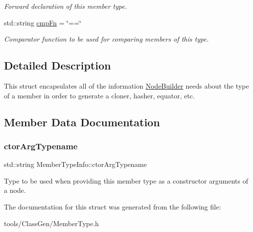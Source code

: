 \begin{DoxyCompactItemize}
\begin{DoxyCompactList}\small\item\em Forward declaration of this member type. \end{DoxyCompactList}\item 
\mbox{\label{struct_member_type_info_abf6a66ee80b0f3680c6bd0b86d61a858}} 
std\+::string \hyperlink{struct_member_type_info_abf6a66ee80b0f3680c6bd0b86d61a858}{cmp\+Fn} = \char`\"{}==\char`\"{}
\begin{DoxyCompactList}\small\item\em Comparator function to be used for comparing members of this type. \end{DoxyCompactList}\end{DoxyCompactItemize}


\subsection{Detailed Description}
This struct encapsulates all of the information \hyperlink{class_node_builder}{Node\+Builder} needs about the type of a member in order to generate a cloner, hasher, equator, etc. 

\subsection{Member Data Documentation}
\mbox{\label{struct_member_type_info_a9ffc1a49b5f4f42c42175ad77444176b}} 
\subsubsection{\texorpdfstring{ctor\+Arg\+Typename}{ctorArgTypename}}
{\footnotesize\ttfamily std\+::string Member\+Type\+Info\+::ctor\+Arg\+Typename}

Type to be used when providing this member type as a constructor arguments of a node. 

The documentation for this struct was generated from the following file\+:\begin{DoxyCompactItemize}
\item 
tools/\+Class\+Gen/Member\+Type.\+h\end{DoxyCompactItemize}
